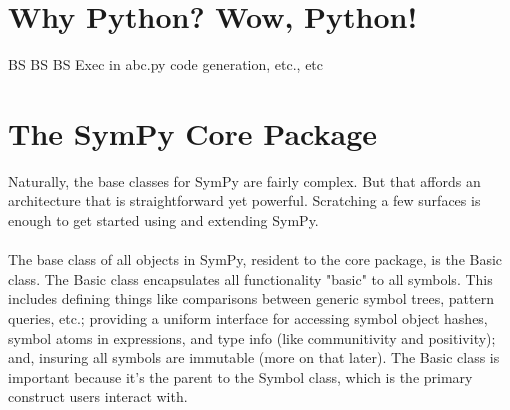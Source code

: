 \documentclass[11pt,a4paper,oneside]{report}
\begin{document}
 \section*{Why Python? Wow, Python!}
 BS BS BS
 Exec in abc.py code generation, etc., etc
 \section*{The SymPy Core Package}
Naturally, the base classes for SymPy are fairly complex. But that affords an architecture that is straightforward yet powerful. Scratching a few surfaces is enough to get started using and extending SymPy.\\\\
The base class of all objects in SymPy, resident to the core package, is the Basic class. The Basic class encapsulates all functionality "basic" to all symbols. This includes defining things like comparisons between generic symbol trees, pattern queries, etc.; providing a uniform interface for accessing symbol object hashes, symbol atoms in expressions, and type info (like communitivity and positivity); and, insuring all symbols are immutable (more on that later). The Basic class is important because it's the parent to the Symbol class, which is the primary construct users interact with.
\end{document}
